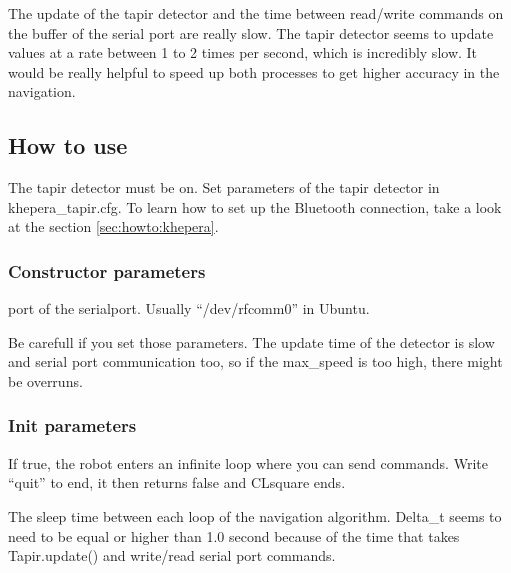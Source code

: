 The update of the tapir detector and the time between read/write commands 
on the buffer of the serial port are really slow. The tapir detector 
seems to update values at a rate between 1 to 2 times per second, 
which is incredibly slow. It would be really helpful to speed up both 
processes to get higher accuracy in the navigation.

\subsection{How to use}
\label{sec:dk:howto}
The tapir detector must be on. Set parameters of the tapir detector in 
khepera\_tapir.cfg. To learn how to set up the Bluetooth connection, 
take a look at the section \ref{sec:howto:khepera}.

\subsubsection{Constructor parameters}
\label{sec:dk:howto:constparams}
    \begin{description} \itemindent=-15pt
        \item[PORT] port of the serialport. Usually “/dev/rfcomm0” in 
            Ubuntu.
        \item[Max\_speed, min\_speed (optional)] Be carefull if you set 
            those parameters. The update time of the detector is slow 
            and serial port communication too, so if the max\_speed is 
            too high, there might be overruns.
    \end{description}

\subsubsection{Init parameters}
\label{sec:dk:howto:initparams}
    \begin{description} \itemindent=-15pt
        \item[manipulate] If true, the robot enters an infinite loop where 
            you can send commands. Write “quit” to end, it then returns 
            false and CLsquare ends.
        \item[delta\_t] The sleep time between each loop of the 
            navigation algorithm. Delta\_t seems to need to be equal 
            or higher than 1.0 second because of the time that 
            takes Tapir.update() and write/read serial port commands.
    \end{description}
